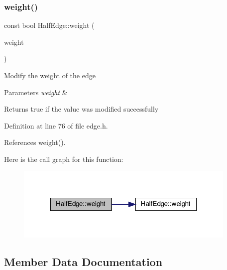 \mbox{\label{classHalfEdge_ac1a67d4cdc5cd8ff286f7f27d691323d}} 
\subsubsection{\texorpdfstring{weight()}{weight()}\hspace{0.1cm}{\footnotesize\ttfamily [2/2]}}
{\footnotesize\ttfamily const bool Half\+Edge\+::weight (\begin{DoxyParamCaption}\item[{const \hyperlink{edge_8h_a2e7ea3be891ac8b52f749ec73fee6dd2}{type\+Weight} \&}]{weight }\end{DoxyParamCaption})\hspace{0.3cm}{\ttfamily [inline]}}

Modify the weight of the edge 
\begin{DoxyParams}{Parameters}
{\em weight} & \\
\hline
\end{DoxyParams}
\begin{DoxyReturn}{Returns}
true if the value was modified successfully 
\end{DoxyReturn}


Definition at line 76 of file edge.\+h.



References weight().

Here is the call graph for this function\+:\nopagebreak
\begin{figure}[H]
\begin{center}
\leavevmode
\includegraphics[width=300pt]{classHalfEdge_ac1a67d4cdc5cd8ff286f7f27d691323d_cgraph}
\end{center}
\end{figure}


\subsection{Member Data Documentation}
\mbox{\label{classHalfEdge_adcf841beaad30d58d0e9883c2fbc196e}} 
